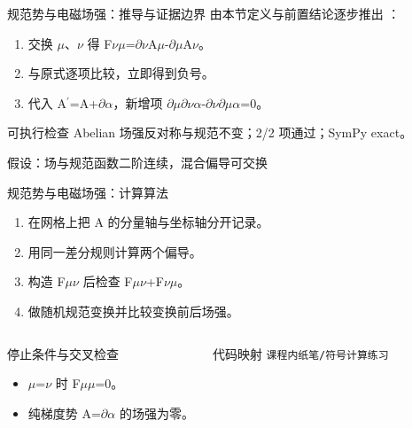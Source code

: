 \begin{frame}[t]{规范势与电磁场强：推导与证据边界}
\footnotesize
{}\quad 由本节定义与前置结论逐步推出 ：
\begin{enumerate}
\item 交换 \ensuremath{\mu}、\ensuremath{\nu} 得 F\ensuremath{\nu}\ensuremath{\mu}=\ensuremath{\partial}\ensuremath{\nu}A\ensuremath{\mu}-\ensuremath{\partial}\ensuremath{\mu}A\ensuremath{\nu}。
\item 与原式逐项比较，立即得到负号。
\item 代入 A\ensuremath{^{\prime}}=A+\ensuremath{\partial}\ensuremath{\alpha}，新增项 \ensuremath{\partial}\ensuremath{\mu}\ensuremath{\partial}\ensuremath{\nu}\ensuremath{\alpha}-\ensuremath{\partial}\ensuremath{\nu}\ensuremath{\partial}\ensuremath{\mu}\ensuremath{\alpha}=0。
\end{enumerate}\begin{block}{可执行检查}
\quad Abelian 场强反对称与规范不变；2/2 项通过；SymPy exact。
\par\scriptsize 假设：场与规范函数二阶连续，混合偏导可交换
\end{block}
\end{frame}

\begin{frame}[t]{规范势与电磁场强：计算算法}
\footnotesize
{}\begin{enumerate}
\item 在网格上把 A 的分量轴与坐标轴分开记录。
\item 用同一差分规则计算两个偏导。
\item 构造 F\ensuremath{\mu}\ensuremath{\nu} 后检查 F\ensuremath{\mu}\ensuremath{\nu}+F\ensuremath{\nu}\ensuremath{\mu}。
\item 做随机规范变换并比较变换前后场强。
\end{enumerate}\begin{columns}[T,onlytextwidth]
\begin{block}{停止条件与交叉检查}\scriptsize\begin{itemize}
\item[\CheckMark] \ensuremath{\mu}=\ensuremath{\nu} 时 F\ensuremath{\mu}\ensuremath{\mu}=0。
\item[\CheckMark] 纯梯度势 A=\ensuremath{\partial}\ensuremath{\alpha} 的场强为零。
\end{itemize}\end{block}
\begin{block}{代码映射}
\scriptsize \texttt{课程内纸笔/\allowbreak{}符号计算练习}
\end{block}\end{columns}\end{frame}

